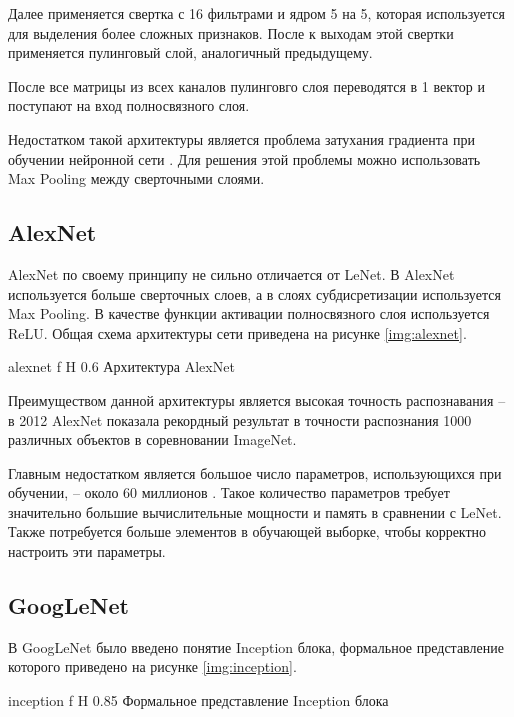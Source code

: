 Далее применяется свертка с 16 фильтрами и ядром 5 на 5, которая используется для выделения более сложных признаков. После к выходам этой свертки применяется пулинговый слой, аналогичный предыдущему. 

После все матрицы из всех каналов пулинговго слоя переводятся в 1 вектор и поступают на вход полносвязного слоя.

Недостатком такой архитектуры является проблема затухания градиента при обучении нейронной сети \cite{architectures}. Для решения этой проблемы можно использовать Max Pooling между сверточными слоями.

\subsection{AlexNet}\label{sec:alexnet}

AlexNet по своему принципу не сильно отличается от LeNet. В AlexNet используется больше сверточных слоев, а в слоях субдисретизации используется Max Pooling. В качестве функции активации полносвязного слоя используется ReLU. Общая схема архитектуры сети приведена на рисунке \ref{img:alexnet}.

{alexnet} %
{f} %
{H} %
{0.6\textwidth} %
{Архитектура AlexNet} %

Преимуществом данной архитектуры является высокая точность распознавания -- в 2012 AlexNet показала рекордный результат в точности распознания 1000 различных объектов в соревновании ImageNet.

Главным недостатком является большое число параметров, использующихся при обучении, -- около 60 миллионов \cite{architectures}. Такое количество параметров требует значительно большие вычислительные мощности и память в сравнении с LeNet. Также потребуется больше элементов в обучающей выборке, чтобы корректно настроить эти параметры.

\subsection{GoogLeNet}

В GoogLeNet было введено понятие Inception блока, формальное представление которого приведено на рисунке \ref{img:inception}.

{inception} %
{f} %
{H} %
{0.85\textwidth} %
{Формальное представление Inception блока} %

